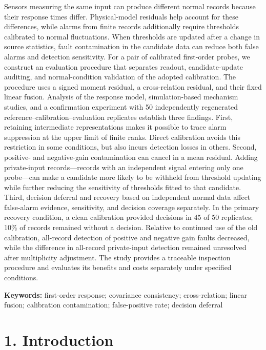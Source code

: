 \documentclass[10pt,a4paper]{article}
\begin{document}
Sensors measuring the same input can produce different normal records because their response times differ. Physical-model residuals help account for these differences, while alarms from finite records additionally require thresholds calibrated to normal fluctuations. When thresholds are updated after a change in source statistics, fault contamination in the candidate data can reduce both false alarms and detection sensitivity. For a pair of calibrated first-order probes, we construct an evaluation procedure that separates readout, candidate-update auditing, and normal-condition validation of the adopted calibration. The procedure uses a signed moment residual, a cross-relation residual, and their fixed linear fusion. Analysis of the response model, simulation-based mechanism studies, and a confirmation experiment with 50 independently regenerated reference–calibration–evaluation replicates establish three findings. First, retaining intermediate representations makes it possible to trace alarm suppression at the upper limit of finite ranks. Direct calibration avoids this restriction in some conditions, but also incurs detection losses in others. Second, positive- and negative-gain contamination can cancel in a mean residual. Adding private-input records—records with an independent signal entering only one probe—can make a candidate more likely to be withheld from threshold updating while further reducing the sensitivity of thresholds fitted to that candidate. Third, decision deferral and recovery based on independent normal data affect false-alarm evidence, sensitivity, and decision coverage separately. In the primary recovery condition, a clean calibration provided decisions in 45 of 50 replicates; 10\% of records remained without a decision. Relative to continued use of the old calibration, all-record detection of positive and negative gain faults decreased, while the difference in all-record private-input detection remained unresolved after multiplicity adjustment. The study provides a traceable inspection procedure and evaluates its benefits and costs separately under specified conditions.

\textbf{Keywords:} first-order response; covariance consistency; cross-relation; linear fusion; calibration contamination; false-positive rate; decision deferral

\clearpage

\section{1. Introduction}
\end{document}
